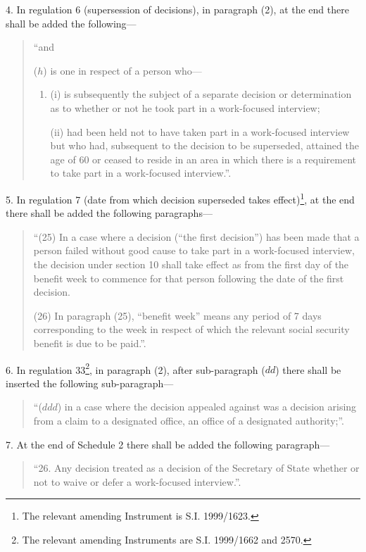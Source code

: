 \documentclass[12pt,a4paper]{article}
\begin{document}
\medskip

4.  In regulation 6 (supersession of decisions), in paragraph (2), at the end there shall be added the following—
\begin{quotation}
“and

($h$) is one in respect of a person who—
\begin{enumerate}\item[]
(i) is subsequently the subject of a separate decision or determination as to whether or not he took part in a work-focused interview;

(ii) had been held not to have taken part in a work-focused interview but who had, subsequent to the decision to be superseded, attained the age of 60 or ceased to reside in an area in which there is a requirement to take part in a work-focused interview.”.
\end{enumerate}
\end{quotation}

\medskip

5.  In regulation 7 (date from which decision superseded takes effect)\footnote{\frenchspacing The relevant amending Instrument is S.I. 1999/1623.}, at the end there shall be added the following paragraphs—
\begin{quotation}
“(25) In a case where a decision (“the first decision”) has been made that a person failed without good cause to take part in a work-focused interview, the decision under section 10 shall take effect as from the first day of the benefit week to commence for that person following the date of the first decision.

(26) In paragraph (25), “benefit week” means any period of 7 days corresponding to the week in respect of which the relevant social security benefit is due to be paid.”.
\end{quotation}

\medskip

6.  In regulation 33\footnote{\frenchspacing The relevant amending Instruments are S.I. 1999/1662 and 2570.}, in paragraph (2), after sub-paragraph ($dd$)  there shall be inserted the following sub-paragraph—
\begin{quotation}
“($ddd$) in a case where the decision appealed against was a decision arising from a claim to a designated office, an office of a designated authority;”.
\end{quotation}

\medskip

7.  At the end of Schedule 2 there shall be added the following paragraph—
\begin{quotation}
“26.  Any decision treated as a decision of the Secretary of State whether or not to waive or defer a work-focused interview.”.
\end{quotation}
\end{document}
